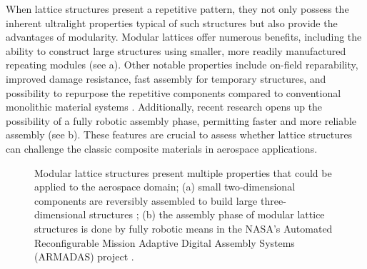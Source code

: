 When lattice structures present a repetitive pattern, they not only possess the inherent ultralight properties typical of such structures but also provide the advantages of modularity. Modular lattices offer numerous benefits, including the ability to construct large structures using smaller, more readily manufactured repeating modules (see a). Other notable properties include on-field reparability, improved damage resistance, fast assembly for temporary structures, and possibility to repurpose the repetitive components compared to conventional monolithic material systems . Additionally, recent research opens up the possibility of a fully robotic assembly phase, permitting faster and more reliable assembly (see b). These features are crucial to assess whether lattice structures can challenge the classic composite materials in aerospace applications.

\begin{figure}
    \hspace*{\fill}
    \hfill
    \hspace*{\fill}
    \caption{Modular lattice structures present multiple properties that could be applied to the aerospace domain; (a) small two-dimensional components are reversibly assembled to build large three-dimensional structures \cite{cheung_reversibly_2013}; (b) the assembly phase of modular lattice structures is done by fully robotic means in the NASA's Automated Reconfigurable Mission Adaptive Digital Assembly Systems (ARMADAS) project \cite{costa_algorithmic_2020}.}
    \label{fig:01_fab}
\end{figure}

